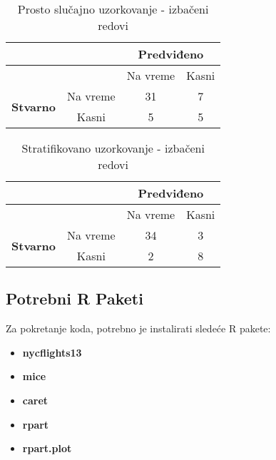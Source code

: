\documentclass{article}
\begin{document}
\begin{table}[H]
    \centering
    \begin{tabular}{|c|c|c|c|}
        \hline
        \multicolumn{2}{|c|}{} & \multicolumn{2}{c|}{\textbf{Predviđeno}} \\
        \hline
        \multicolumn{2}{|c|}{} & Na vreme & Kasni \\
        \hline
        \multirow{2}{*}{\textbf{Stvarno}} & Na vreme & 31 & 7 \\
        \cline{2-4}
         & Kasni & 5 & 5 \\
        \hline
    \end{tabular}
    \caption{Prosto slučajno uzorkovanje - izbačeni redovi}
    \label{table:confusion_matrix7}
\end{table}

\begin{table}[H]
    \centering
    \begin{tabular}{|c|c|c|c|}
        \hline
        \multicolumn{2}{|c|}{} & \multicolumn{2}{c|}{\textbf{Predviđeno}} \\
        \hline
        \multicolumn{2}{|c|}{} & Na vreme & Kasni \\
        \hline
        \multirow{2}{*}{\textbf{Stvarno}} & Na vreme & 34 & 3 \\
        \cline{2-4}
         & Kasni & 2 & 8 \\
        \hline
    \end{tabular}
    \caption{Stratifikovano uzorkovanje - izbačeni redovi}
    \label{table:confusion_matrix8}
\end{table}

\newpage

\subsection*{Potrebni R Paketi}

Za pokretanje koda, potrebno je instalirati sledeće R pakete:

\begin{itemize}
    \item \textbf{nycflights13}
    \item \textbf{mice}
    \item \textbf{caret}
    \item \textbf{rpart}
    \item \textbf{rpart.plot}
\end{itemize}

\newpage
\end{document}
